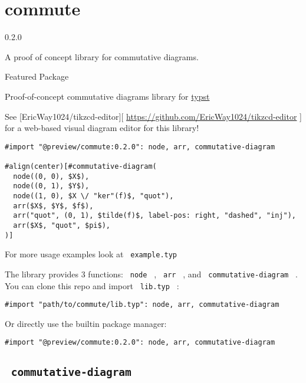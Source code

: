 \label{banner}
\section{commute}\label{commute}

{ 0.2.0 }

A proof of concept library for commutative diagrams.

{ } Featured Package

\label{readme}
Proof-of-concept commutative diagrams library for
\href{https://typst.app/home}{typst}

See {[}EricWay1024/tikzcd-editor{]}{[}
\url{https://github.com/EricWay1024/tikzcd-editor} {]} for a web-based
visual diagram editor for this library!

\begin{verbatim}
#import "@preview/commute:0.2.0": node, arr, commutative-diagram

#align(center)[#commutative-diagram(
  node((0, 0), $X$),
  node((0, 1), $Y$),
  node((1, 0), $X \/ "ker"(f)$, "quot"),
  arr($X$, $Y$, $f$),
  arr("quot", (0, 1), $tilde(f)$, label-pos: right, "dashed", "inj"),
  arr($X$, "quot", $pi$),
)]
\end{verbatim}


For more usage examples look at \texttt{\ example.typ\ }

The library provides 3 functions: \texttt{\ node\ } , \texttt{\ arr\ } ,
and \texttt{\ commutative-diagram\ } . You can clone this repo and
import \texttt{\ lib.typ\ } :

\begin{verbatim}
#import "path/to/commute/lib.typ": node, arr, commutative-diagram
\end{verbatim}

Or directly use the builtin package manager:

\begin{verbatim}
#import "@preview/commute:0.2.0": node, arr, commutative-diagram
\end{verbatim}

\subsection{\texorpdfstring{\texttt{\ commutative-diagram\ }}{ commutative-diagram }}\label{commutative-diagram}

